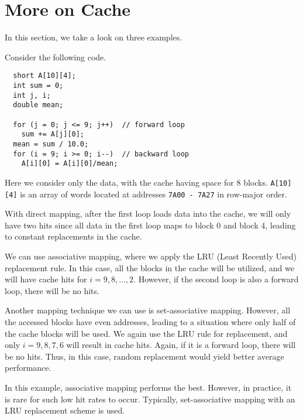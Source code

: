 \section{More on Cache}
In this section, we take a look on three examples. 

\begin{eg}
Consider the following code. 

\begin{verbatim}
  short A[10][4];
  int sum = 0;
  int j, i;
  double mean;

  for (j = 0; j <= 9; j++)  // forward loop
    sum += A[j][0];
  mean = sum / 10.0;
  for (i = 9; i >= 0; i--)  // backward loop
    A[i][0] = A[i][0]/mean;
\end{verbatim}

Here we consider only the data, with the cache having space for 8 blocks. \verb|A[10][4]| is an array of words located at addresses \verb|7A00 - 7A27| in row-major order.

With direct mapping, after the first loop loads data into the cache, we will only have two hits since all data in the first loop maps to block 0 and block 4, leading to constant replacements in the cache.

We can use associative mapping, where we apply the LRU (Least Recently Used) replacement rule. In this case, all the blocks in the cache will be utilized, and we will have cache hits for \(i = 9, 8, \dots, 2\). However, if the second loop is also a forward loop, there will be no hits.

Another mapping technique we can use is set-associative mapping. However, all the accessed blocks have even addresses, leading to a situation where only half of the cache blocks will be used. We again use the LRU rule for replacement, and only \(i = 9, 8, 7, 6\) will result in cache hits. Again, if it is a forward loop, there will be no hits. Thus, in this case, random replacement would yield better average performance.
\end{eg}

In this example, associative mapping performs the best. However, in practice, it is rare for such low hit rates to occur. Typically, set-associative mapping with an LRU replacement scheme is used.

